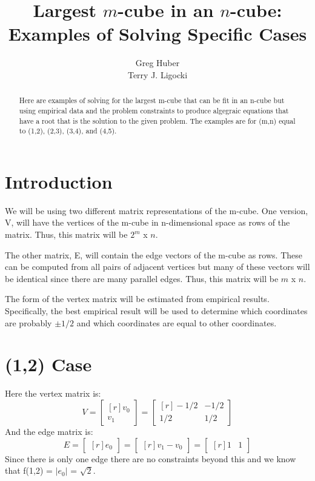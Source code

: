 \documentclass[12pt,titlepage]{article}
\title{\bf Largest $m$-cube in an $n$-cube: \\
       Examples of Solving Specific Cases
      }
\author{Greg Huber \\
        Terry J. Ligocki
       }
\numberwithin{equation}{section}
\begin{document}
\maketitle

\begin{abstract}
Here are examples of solving for the largest m-cube that can be fit in an
n-cube but using empirical data and the problem constraints to produce
algegraic equations that have a root that is the solution to the given
problem.  The examples are for (m,n) equal to (1,2), (2,3), (3,4), and
(4,5).
\end{abstract}

\section{Introduction}

We will be using two different matrix representations of the m-cube.  One
version, V, will have the vertices of the m-cube in n-dimensional space as
rows of the matrix.  Thus, this matrix will be $2^m$ x $n$.

The other matrix, E, will contain the edge vectors of the m-cube as rows.
These can be computed from all pairs of adjacent vertices but many of these
vectors will be identical since there are many parallel edges.  Thus, this
matrix will be $m$ x $n$.

The form of the vertex matrix will be estimated from empirical results.
Specifically, the best empirical result will be used to determine which
coordinates are probably $\pm 1/2$ and which coordinates are equal to other
coordinates.

\section{(1,2) Case}

Here the vertex matrix is:
\begin{equation*}
V =
\begin{bmatrix*}[r]
v_0 \\
v_1
\end{bmatrix*}
=
\begin{bmatrix*}[r]
-1/2 & -1/2  \\
 1/2 &  1/2 
\end{bmatrix*}
\end{equation*}
And the edge matrix is:
\begin{equation*}
E =
\begin{bmatrix*}[r]
e_0
\end{bmatrix*}
=
\begin{bmatrix*}[r]
v_1 - v_0
\end{bmatrix*}
=
\begin{bmatrix*}[r]
 1 & 1
\end{bmatrix*}
\end{equation*}
Since there is only one edge there are no constraints beyond this and we know
that f(1,2) = $|e_0|$ = $\sqrt{2}$.
\end{document}

